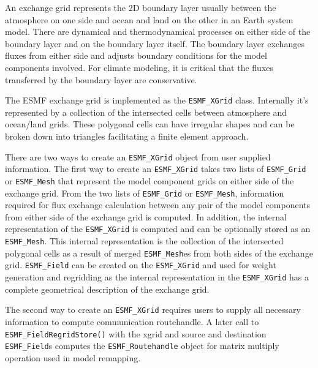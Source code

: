 
\label{sec:xgrid:desc}
An exchange grid represents the 2D boundary layer usually between the
atmosphere on one side and ocean and land on the other in an Earth
system model. There are dynamical and thermodynamical processes on
either side of the boundary layer and on the boundary layer itself.
The boundary layer exchanges fluxes from either side and adjusts
boundary conditions for the model components involved. For climate modeling,
it is critical that the fluxes transferred by the boundary layer are
conservative.

The ESMF exchange grid is implemented as the {\tt ESMF\_XGrid} class. 
Internally it's represented by a collection of the intersected cells
between atmosphere and ocean/land\cite{BalajiXGrid} grids. 
These polygonal cells can have irregular shapes
and can be broken down into triangles facilitating a finite element
approach. 

There are two ways to create an {\tt ESMF\_XGrid} object from
user supplied information. The first way to create an {\tt ESMF\_XGrid} takes
two lists of {\tt ESMF\_Grid} or {\tt ESMF\_Mesh} that represent the model component grids on
either side of the exchange grid. From the two lists of {\tt ESMF\_Grid} or {\tt ESMF\_Mesh},
information required for flux exchange calculation between any pair of the 
model components from either side of the exchange grid is computed. In addition, the
internal representation of the {\tt ESMF\_XGrid} is computed and can be optionally stored
as an {\tt ESMF\_Mesh}. This internal representation is the collection of the intersected
polygonal cells as a result of merged {\tt ESMF\_Mesh}es from both sides of the exchange grid.
{\tt ESMF\_Field} can be created on the {\tt ESMF\_XGrid} and used for weight generation
and regridding as the internal representation in the {\tt ESMF\_XGrid} has
a complete geometrical description of the exchange grid.

The second way 
to create an {\tt ESMF\_XGrid} requires users to supply all necessary information
to compute communication routehandle. A later
call to {\tt ESMF\_FieldRegridStore()} with the xgrid and source and destination
{\tt ESMF\_Field}s computes the {\tt ESMF\_Routehandle} object for matrix
multiply operation used in model remapping. 

